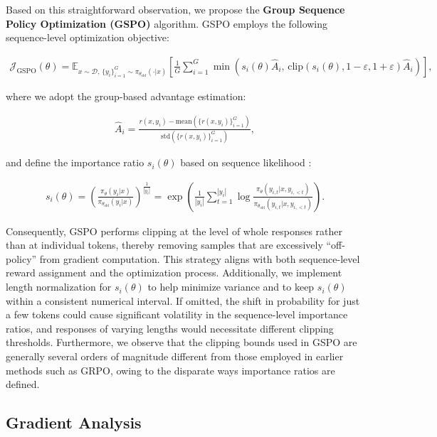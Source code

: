 Based on this straightforward observation, we propose the \textbf{Group Sequence Policy Optimization (GSPO)} algorithm. GSPO employs the following sequence-level optimization objective:

\begin{align}
\mathcal{J}_\text{GSPO} (\theta) =
\mathbb{E}_{ x \sim \mathcal{D},\, \{y_i\}_{i=1}^G \sim \pi_{\theta_\text{old}}( \cdot | x) }
\left[ 
\frac{1}{G} \sum_{i=1}^{G}
\min \left( s_{i}(\theta)  \widehat{A}_{i},  \, \mathrm{clip} \left( s_{i}(\theta), 1 - {\varepsilon}, 1 + {\varepsilon} \right) \widehat{A}_{i} \right) 
\right],
\label{equ:gspo}
\end{align}

where we adopt the group-based advantage estimation:

\begin{align}
\widehat{A}_{i} = \frac{r(x, y_i) - \mathrm{mean} \left( \{ r(x, y_i) \}_{i=1}^G \right) }{ \mathrm{std} \left( \{ r(x, y_i) \}_{i=1}^G \right) },
\end{align}

and define the importance ratio $s_{i}(\theta)$ based on sequence likelihood \citep{click}:

\begin{align}
s_{i}(\theta) = \left( \frac{ \pi_{\theta} (y_i | x) }{ \pi_{\theta_\text{old}} (y_i | x)} \right)^{\frac{1}{|y_i|}}
=
\exp \left( \frac{1}{|y_i|} \sum_{t=1}^{|y_i|} \log \frac{ \pi_{\theta} (y_{i,t} | x, y_{i,<t}) }{ \pi_{\theta_\text{old}} (y_{i,t} | x,y_{i,<t})} \right).
\end{align}

Consequently, GSPO performs clipping at the level of whole responses rather than at individual tokens, thereby removing samples that are excessively ``off-policy'' from gradient computation. This strategy aligns with both sequence-level reward assignment and the optimization process. Additionally, we implement length normalization for $s_{i}(\theta)$ to help minimize variance and to keep $s_{i}(\theta)$ within a consistent numerical interval. If omitted, the shift in probability for just a few tokens could cause significant volatility in the sequence-level importance ratios, and responses of varying lengths would necessitate different clipping thresholds. Furthermore, we observe that the clipping bounds used in GSPO are generally several orders of magnitude different from those employed in earlier methods such as GRPO, owing to the disparate ways importance ratios are defined.

\subsection{Gradient Analysis}
\label{subsec:gradient}

